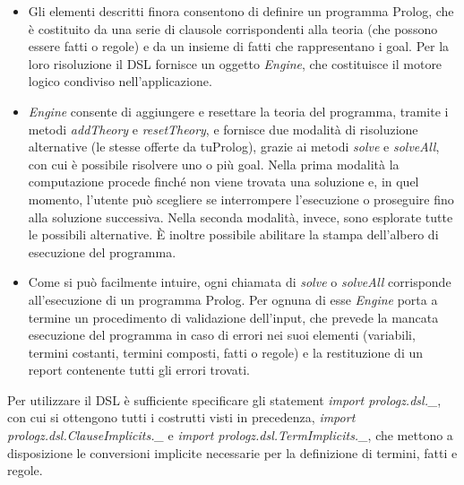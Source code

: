 \begin{itemize}

\item Gli elementi descritti finora consentono di definire un programma Prolog, che è costituito da una serie di clausole corrispondenti alla teoria (che possono essere fatti o regole) e da un insieme di fatti che rappresentano i goal. Per la loro risoluzione il DSL fornisce un oggetto \textit{Engine}, che costituisce il motore logico condiviso nell'applicazione.
\item \textit{Engine} consente di aggiungere e resettare la teoria del programma, tramite i metodi \textit{addTheory} e \textit{resetTheory}, e fornisce due modalità di risoluzione alternative (le stesse offerte da tuProlog), grazie ai metodi \textit{solve} e \textit{solveAll}, con cui è possibile risolvere uno o più goal. Nella prima modalità la computazione procede finché non viene trovata una soluzione e, in quel momento, l'utente può scegliere se interrompere l'esecuzione o proseguire fino alla soluzione successiva. Nella seconda modalità, invece, sono esplorate tutte le possibili alternative. È inoltre possibile abilitare la stampa dell'albero di esecuzione del programma.
\item Come si può facilmente intuire, ogni chiamata di \textit{solve} o \textit{solveAll} corrisponde all'esecuzione di un programma Prolog. Per ognuna di esse \textit{Engine} porta a termine un procedimento di validazione dell'input, che prevede la mancata esecuzione del programma in caso di errori nei suoi elementi (variabili, termini costanti, termini composti, fatti o regole) e la restituzione di un report contenente tutti gli errori trovati.
\end{itemize}

Per utilizzare il DSL è sufficiente specificare gli statement \textit{import prologz.dsl.\_}, con cui si ottengono tutti i costrutti visti in precedenza, \textit{import prologz.dsl.ClauseImplicits.\_} e \textit{import prologz.dsl.TermImplicits.\_}, che mettono a disposizione le conversioni implicite necessarie per la definizione di termini, fatti e regole.

